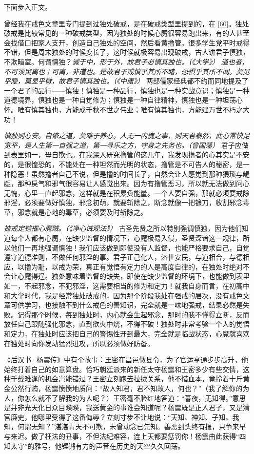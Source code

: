 下面步入正文。

曾经我在戒色文章里专门提到过独处破戒，是在破戒类型里提到的，在 \ref{60}。独处破戒是比较常见的一种破戒类型，因为独处的时候心魔很容易跑出来，有的人甚至会找借口把家人支开，创造自己独处的空间，然后看黄撸管。很多学生党平时戒得不错，但是周末独处的时候变长了，这时候就极容易出现破戒，古人讲君子慎独，不欺暗室。何谓慎独？\textit{诚于中，形于外，故君子必慎其独也。（《大学》）} \textit{道也者，不可须臾离也；可离，非道也。是故君子戒慎乎其所不睹，恐惧乎其所不闻。莫见乎隐，莫显乎微，故君子慎其独也。（《中庸》）} 两部儒家经典都不约而同地提及了一个君子的品行——慎独！慎独是一种品行，慎独也是一种实战意识；慎独是一种道德境界，慎独也是一种自觉修为；慎独是一种自律精神，慎独也是一种坦荡心怀。唯有慎其独也，方能成千秋不世之伟业；唯有慎其独也，方能建万世不朽之大功！

\textit{慎独则心安。自修之道，莫难于养心。人无一内愧之事，则天君泰然，此心常快足宽平，是人生第一自强之道，第一寻乐之方，守身之先务也。（曾国藩）} 君子应做到表里如一，毋自欺也。在我深入研究撸管的这几年，我发现撸者的心其实是不安的，是很惶恐的，不能处在一种坦然而光明的状态，撸管是不可告人的秘密，是一种隐恶！虽然撸者自己不说，但是撸的时间长了，自然会让人感觉到那种猥琐与龌龊，那种戾气和邪气很容易让人感觉出来。因为有撸管恶习，所以就无法做到问心无愧，心里一直起邪念，这样就是在积累负能量。一个人要自强，那就必须要戒除邪淫，必须要做好慎独，邪念初萌，就要斩除之，断念就像一把镰刀，收割邪念毒草，邪念就是心地的毒草，必须要及时斩除之。

\textit{披戒定铠摧心魔贼。（《净心诫观法》）} 古圣先贤之所以特别强调慎独，因为他们知道每个人都有心魔，在缺少监督的情况下，心魔极易入侵，圣贤深谙这一规律，所以他们一再地强调慎独！我们应该做到即使没有人监督，也能严格要求自己，自觉遵守道德准则，不做任何邪淫的事。君子正己化人，济世安民，与道相合，与德相应，以撸为耻，以戒为荣，真正有觉悟有定力的人是高度自律的，在独处时绝对不会让心魔得逞。独处意味着监督的缺失，即使在缺少监督的环境下，也能做到表里如一，不起邪念，不犯邪淫，这需要相当的修为和定力！就我自身而言，在初高中和大学时代，我是经常独处破戒的，因为那个阶段我处在强戒的层次，没有戒色文章可供学习，也接触不到什么戒色的善知识，完全就是一味地强戒，结果必然是失败。记得那个时候，每到独处时，内心就会生起邪念，那时的我不懂得立断，反而放任自己跟随强化邪念，直到欲火中烧，不得不破！独处时非常考验一个人的觉悟和定力，在独处时应该把自己的警惕性开到最大，完全就是临战状态，心魔就喜欢在独处时向你发动猛烈进攻，所以必须做好防备。

《后汉书·杨震传》中有个故事：王密在昌邑做县令，为了官运亨通步步高升，他始终打着自己的如意算盘。恰巧朝廷派来的新任太守杨震和王密多少有些交情，这种千载难逢的机会岂能错过？王密立刻跑去拉拢关系，他不惜血本，竟拎着十斤黄金公然行贿，杨震愤愤地质问：“故人知君，君不知故人，何也？”（我了解你的为人，你怎么就不了解我的为人呢？）王密毫不脸红地答道：“暮夜，无知得。”意思是并非光天化日众目睽睽，我送黄金的事谁会知道呢？杨震既是正人君子，又是清官廉吏，他哪里受得了这番侮辱？立刻寸步不让地说：“天知、神知、子知、我知，何谓无知？”湛湛青天不可欺，未曾动念已先知。善恶到头终有报，只争来早与来迟。做了枉法的丑事，不但法纪难容，连上天都要惩罚你！杨震由此获得“四知太守”的雅号，他铿锵有力的声音在历史的天空久久回荡。

